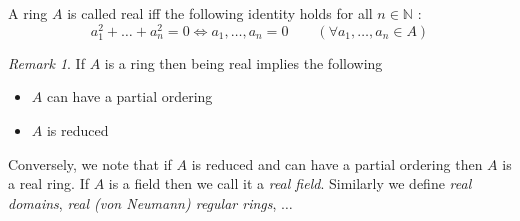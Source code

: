 \documentclass[12pt]{article}
\theoremstyle{definition}
\theoremstyle{remark}
\newtheorem*{rem}{Remark} %
\newcommand{\N}{\mathbb{N}}
\begin{document}
A ring $A$ is called real iff the following identity holds for all $n\in \N$ :
$$a_1^2 + \dots + a_n^2 = 0 \Leftrightarrow a_1,\dots,a_n = 0  \qquad (\forall a_1,\dots,a_n\in A)$$

\begin{rem} If $A$ is a ring then being real implies the following
\begin{itemize}
\item $A$ can have a partial ordering
\item $A$ is reduced
\end{itemize}
Conversely, we note that if $A$ is reduced and can have a partial ordering then $A$ is a real ring.
If $A$ is a field then we call it a \emph{real field}. Similarly we define \emph{real domains}, 
\emph{real (von Neumann) regular rings}, $\dots$
\end{rem}

\end{document}
